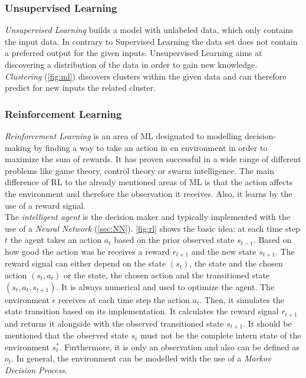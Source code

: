 \subsubsection{Unsupervised Learning}
\emph{Unsupervised Learning} builds a model with unlabeled data, which only contains the input data. 
In contrary to Supervised Learning the data set does not contain a preferred output for the given inputs. 
Unsupervised Learning aims at discovering a distribution of the data in order to gain new knowledge.\\
\emph{Clustering} (\cref{fig:ml}) discovers clusters within the given data and can therefore predict for new inputs the related cluster.

\subsubsection{Reinforcement Learning}
\emph{Reinforcement Learning} is an area of ML designated to modelling decision-making by finding a way to take an action in en environment in order to maximize the sum of rewards. 
It has proven successful in a wide range of different problems like game theory, control theory or swarm intelligence. 
The main difference of RL to the already mentioned areas of ML is that the action affects the environment and therefore the observation it receives. 
Also, it learns by the use of a reward signal.\\
The \emph{intelligent agent} is the decision maker and typically implemented with the use of a \emph{Neural Network} (\cref{sec:NN}). 
\cref{fig:rl} shows the basic idea: at each time step $t$ the agent takes an action $a_t$ based on the prior observed state $s_{t-1}$. 
Based on how good the action was he receives a reward $r_{t+1}$ and the new state $s_{t+1}$.
The reward signal can either depend on the state $(s_t)$, the state and the chosen action $(s_t, a_t)$ or the state, 
the chosen action and the transitioned state $(s_t, a_t, s_{t+1})$. It is always numerical and used to optimize the agent.
The environment $\epsilon$ receives at each time step the action $a_t$. 
Then, it simulates the state transition based on its implementation. 
It calculates the reward signal $r_{t+1}$ and returns it alongside with the observed transitioned state $s_{t+1}$. 
It should be mentioned that the observed state $s_t$ must not be the complete intern state of the environment $s_t^*$. 
Furthermore, it is only an observation and also can be defined as $o_t$.  
In general, the environment can be modelled with the use of a \emph{Markov Decision Process}.

